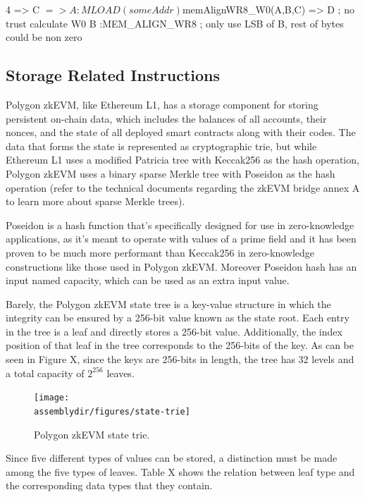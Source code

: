 \begin{zkasm}
4 => C
$ => A          :MLOAD(someAddr)
${memAlignWR8_W0(A,B,C)} => D  ; no trust calculate W0
B               :MEM_ALIGN_WR8 ; only use LSB of B, rest of bytes could be non zero
\end{zkasm}

\subsection{Storage Related Instructions}

Polygon zkEVM, like Ethereum L1, has a storage component for storing persistent on-chain data, which includes the balances of all accounts, their nonces, and the state of all deployed smart contracts along with their codes. The data that forms the state is represented as cryptographic trie, but while Ethereum L1 uses a modified Patricia tree with Keccak256 as the hash operation, Polygon zkEVM uses a binary sparse Merkle tree with Poseidon as the hash operation (refer to the technical documents regarding the zkEVM bridge annex A to learn more about sparse Merkle trees).

Poseidon is a hash function that's specifically designed for use in zero-knowledge applications, as it's meant to operate with values of a prime field and it has been proven to be much more performant than Keccak256 in zero-knowledge constructions like those used in Polygon zkEVM. Moreover Poseidon hash has an input named capacity, which can be used as an extra input value.

Barely, the Polygon zkEVM state tree is a key-value structure in which the integrity can be ensured by a 256-bit value known as the state root. Each entry in the tree is a leaf and directly stores a 256-bit value. Additionally, the index position of that leaf in the tree corresponds to the 256-bits of the key. As can be seen in Figure X, since the keys are 256-bits in length, the tree has 32 levels and a total capacity of $2^{256}$ leaves.


\begin{figure}[H]
\centering
\texttt{[image: \\assemblydir/figures/state-trie]}
\caption{Polygon zkEVM state trie.}
\label{fig:hashk-add-bytes}
\end{figure}

Since five different types of values can be stored, a distinction must be made among the five types of leaves. Table X shows the relation between leaf type and the corresponding data types that they contain.

